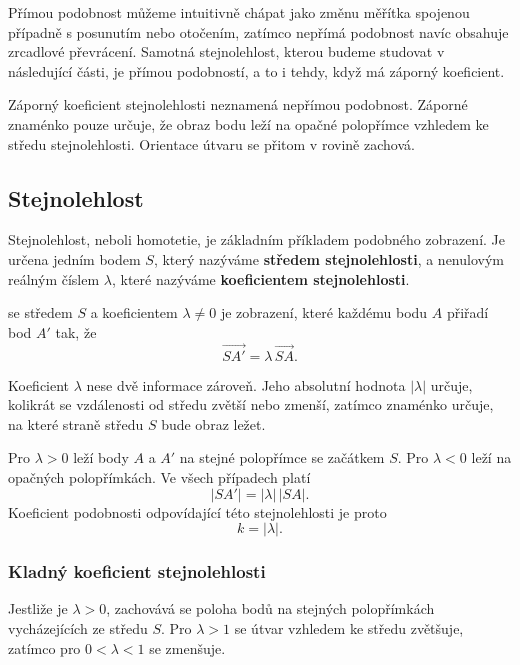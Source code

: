 \documentclass[12pt,a4paper]{article}
\begin{document}
Přímou podobnost můžeme intuitivně chápat jako změnu měřítka spojenou případně s posunutím nebo otočením, zatímco nepřímá podobnost navíc obsahuje zrcadlové převrácení. Samotná stejnolehlost, kterou budeme studovat v následující části, je přímou podobností, a to i tehdy, když má záporný koeficient.

\begin{notebox}
    Záporný koeficient stejnolehlosti neznamená nepřímou podobnost. Záporné znaménko pouze určuje, že obraz bodu leží na opačné polopřímce vzhledem ke středu stejnolehlosti. Orientace útvaru se přitom v rovině zachová.
\end{notebox}



\subsection{Stejnolehlost}

Stejnolehlost, neboli homotetie, je základním příkladem podobného zobrazení. Je určena jedním bodem $S$, který nazýváme \textbf{středem stejnolehlosti}, a nenulovým reálným číslem $\lambda$, které nazýváme \textbf{koeficientem stejnolehlosti}.

\begin{definitionbox}
     se středem $S$ a koeficientem $\lambda\neq0$ je zobrazení, které každému bodu $A$ přiřadí bod $A'$ tak, že
    \[
        \overrightarrow{SA'}=\lambda\,\overrightarrow{SA}.
    \]
\end{definitionbox}

Koeficient $\lambda$ nese dvě informace zároveň. Jeho absolutní hodnota $|\lambda|$ určuje, kolikrát se vzdálenosti od středu zvětší nebo zmenší, zatímco znaménko určuje, na které straně středu $S$ bude obraz ležet.

Pro $\lambda>0$ leží body $A$ a $A'$ na stejné polopřímce se začátkem $S$. Pro $\lambda<0$ leží na opačných polopřímkách. Ve všech případech platí
\[
    |SA'|=|\lambda|\,|SA|.
\]
Koeficient podobnosti odpovídající této stejnolehlosti je proto
\[
    k=|\lambda|.
\]

\subsubsection*{Kladný koeficient stejnolehlosti}

Jestliže je $\lambda>0$, zachovává se poloha bodů na stejných polopřímkách vycházejících ze středu $S$. Pro $\lambda>1$ se útvar vzhledem ke středu zvětšuje, zatímco pro $0<\lambda<1$ se zmenšuje.
\end{document}

